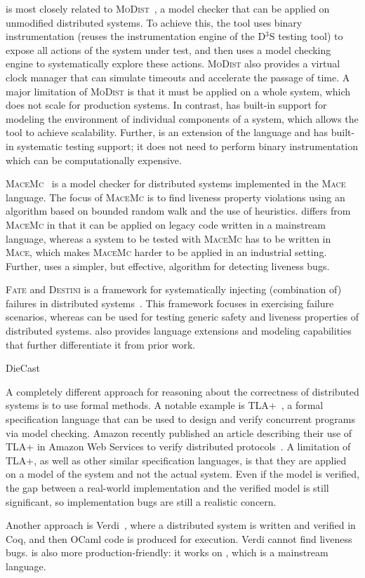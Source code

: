 \psharp is most closely related to \textsc{MoDist}~\cite{yang2009modist}, a model checker that can be applied on unmodified distributed systems. To achieve this, the tool uses binary instrumentation (reuses the instrumentation engine of the D$^3$S testing tool) to expose all actions of the system under test, and then uses a model checking engine to systematically explore these actions. \textsc{MoDist} also provides a virtual clock manager that can simulate timeouts and accelerate the passage of time. A major limitation of \textsc{MoDist} is that it must be applied on a whole system, which does not scale for production systems. In contrast, \psharp has built-in support for modeling the environment of individual components of a system, which allows the tool to achieve scalability. Further, \psharp is an extension of the \csharp language and has built-in systematic testing support; it does not need to perform binary instrumentation which can be computationally expensive.

\textsc{MaceMc}~\cite{killian2007life} is a model checker for distributed systems implemented in the \textsc{Mace} language. The focus of \textsc{MaceMc} is to find liveness property violations using an algorithm based on bounded random walk and the use of heuristics. \psharp differs from \textsc{MaceMc} in that it can be applied on legacy code written in a mainstream language, whereas a system to be tested with \textsc{MaceMc} has to be written in \textsc{Mace}, which makes \textsc{MaceMc} harder to be applied in an industrial setting. Further, \psharp uses a simpler, but effective, algorithm for detecting liveness bugs.

\textsc{Fate} and \textsc{Destini} is a framework for systematically injecting (combination of) failures in distributed systems~\cite{gunawi2011fate}. This framework focuses in exercising failure scenarios, whereas \psharp can be used for testing generic safety and liveness properties of distributed systems. \psharp also provides language extensions and modeling capabilities that further differentiate it from prior work.

DieCast~\cite{gupta2008diecast}

A completely different approach for reasoning about the correctness of distributed systems is to use formal methods.  A notable example is TLA+~\cite{lamport1994temporal}, a formal specification language that can be used to design and verify concurrent programs via model checking. Amazon recently published an article describing their use of TLA+ in Amazon Web Services to verify distributed protocols~\cite{newcombe2015aws}. A limitation of TLA+, as well as other similar specification languages, is that they are applied on a model of the system and not the actual system. Even if the model is verified, the gap between a real-world implementation and the verified model is still significant, so implementation bugs are still a realistic concern.

Another approach is Verdi~\cite{wilcox2015verdi}, where a distributed system is written and verified in Coq, and then OCaml code is produced for execution. Verdi cannot find liveness bugs. \psharp is also more production-friendly: it works on \csharp, which is a mainstream language.
